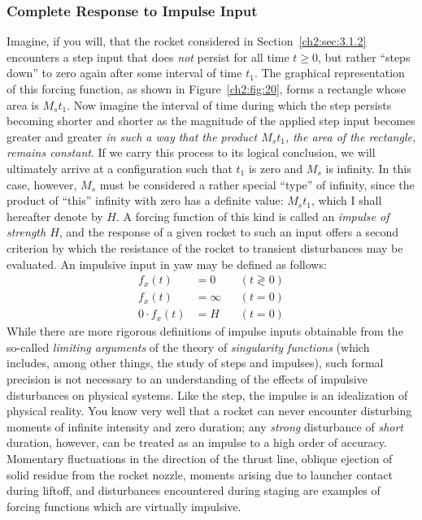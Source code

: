 \subsubsection{Complete Response to Impulse Input}\label{ch2:sec:3.1.3}

Imagine, if you will, that the rocket considered in Section~\ref{ch2:sec:3.1.2}
encounters a step input that does \emph{not} persist for all time $t \ge 0$,
but rather ``steps down'' to zero again after some interval of time $t_1$. The
graphical representation of this forcing function, as shown in
Figure~\ref{ch2:fig:20}, forms a rectangle whose area is $M_s t_1$. Now imagine
the interval of time during which the step persists becoming shorter and
shorter as the magnitude of the applied step input becomes greater and greater
\emph{in such a way that the product $M_s t_1$, the area of the rectangle,
remains constant}. If we carry this process to its logical conclusion, we will
ultimately arrive at a configuration such that $t_1$ is zero and $M_s$ is
infinity. In this case, however, $M_s$ must be considered a rather special
``type'' of infinity, since the product of ``this'' infinity with zero has a
definite value: $M_s t_1$, which I shall hereafter denote by $H$. A forcing
function of this kind is called an \emph{impulse of strength $H$}, and the
response of a given rocket to such an input offers a second criterion by which
the resistance of the rocket to transient disturbances may be evaluated. An
impulsive input in yaw may be defined as follows:
\begin{align*}
f_x(t) &= 0 & &(t \gtrless 0)\\
f_x(t) &= \infty & &(t = 0)\\
0 \cdot f_x(t) &= H & &(t = 0)
\end{align*}
While there are more rigorous definitions of impulse inputs obtainable from
the so-called \emph{limiting arguments} of the theory of \emph{singularity
functions} (which includes, among other things, the study of steps and
impulses), such formal precision is not necessary to an understanding of the
effects of impulsive disturbances on physical systems. Like the step, the
impulse is an idealization of physical reality. You know very well that a
rocket can never encounter disturbing moments of infinite intensity and zero
duration; any \emph{strong} disturbance of \emph{short} duration, however, can
be treated as an impulse to a high order of accuracy. Momentary fluctuations in
the direction of the thrust line, oblique ejection of solid residue from the
rocket nozzle, moments arising due to launcher contact during liftoff, and
disturbances encountered during staging are examples of forcing functions
which are virtually impulsive.

